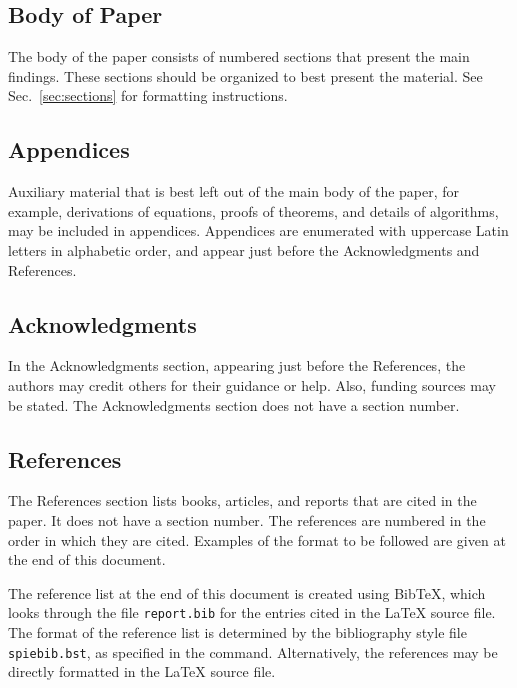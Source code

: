 \documentclass[]{spie}  %
\begin{document}
\subsection{Body of Paper}
The body of the paper consists of numbered sections that present the
main findings.  These sections should be organized to best present the
material.  See Sec.~\ref{sec:sections} for formatting instructions.

\subsection{Appendices}
Auxiliary material that is best left out of the main body of the
paper, for example, derivations of equations, proofs of theorems, and
details of algorithms, may be included in appendices.  Appendices are
enumerated with uppercase Latin letters in alphabetic order, and
appear just before the Acknowledgments and References.

\subsection{Acknowledgments}
In the Acknowledgments section, appearing just before the References,
the authors may credit others for their guidance or help.  Also,
funding sources may be stated.  The Acknowledgments section does not
have a section number.

\subsection{References}
The References section lists books, articles, and reports that are
cited in the paper.  It does not have a section number.  The
references are numbered in the order in which they are cited.
Examples of the format to be followed are given at the end of this
document.

The reference list at the end of this document is created using
BibTeX, which looks through the file {\tt report.bib} for the entries
cited in the LaTeX source file.  The format of the reference list is
determined by the bibliography style file {\tt spiebib.bst}, as
specified in the \verb|| command.
Alternatively, the references may be directly formatted in the LaTeX
source file.
\end{document}
